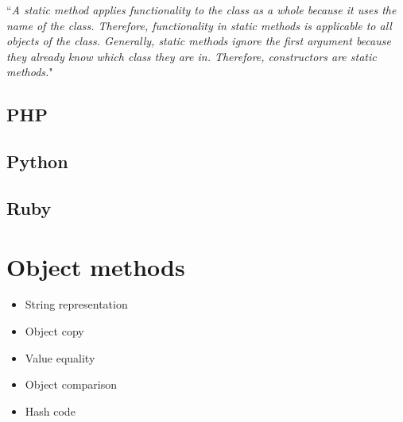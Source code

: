 \documentclass{KodeBook}
\begin{document}
``\textit{A static method applies functionality to the class as a whole because it uses the name of the class. Therefore, functionality in static methods is applicable to all objects of the class. Generally, static methods ignore the first argument because they already know which class they are in. Therefore, constructors are static methods.}"

\subsection{PHP}







\subsection{Python}



\subsection{Ruby}








\section{Object methods}

\begin{itemize}
	\item String representation
	\item Object copy
	\item Value equality
	\item Object comparison
	\item Hash code
\end{itemize}
\end{document}
